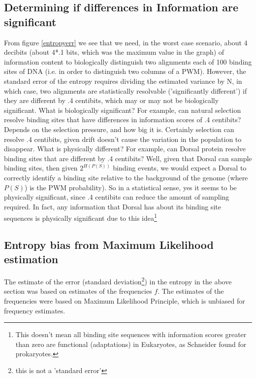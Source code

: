 \subsection*{Determining if differences in Information are significant}

From figure \ref{entropyerr} we see that we need, in the worst case scenario, about 4 decibits (about 4*.1 bits, which was the maximum value in the graph) of information content to biologically distinguish two alignments each of 100 binding sites of DNA (i.e. in order to distinguish two columns of a PWM).  However, the standard error of the entropy requires dividing the estimated variance by N, in which case, two alignments are statistically resolvable ('significantly different') if they are different by .4 centibits, which may or may not be biologically significant.  What is biologically significant?  For example, can natural selection resolve binding sites that have differences in information scores of .4 centibits?  Depends on the selection pressure, and how big it is.  Certainly selection can resolve .4 centibits, given drift doesn't cause the variation in the population to disappear.  What is physically different?  For example, can Dorsal protein resolve binding sites that are different by .4 centibits?  Well, given that Dorsal can sample binding sites, then given $2^{H(P(S))}$ binding events, we would expect a Dorsal to correctly identify a binding site relative to the background of the genome (where $P(S)$) is the PWM probability).  So in a statistical sense, yes it seems to be physically significant, since .4 centibits can reduce the amount of sampling required.  In fact, any information that Dorsal has about its binding site sequences is physically significant due to this idea\footnote{This doesn't mean all binding site sequences with information scores greater than zero are functional (adaptations) in Eukaryotes, as Schneider found for prokaryotes\cite{pmid3525846}.}  


\subsection*{Entropy bias from Maximum Likelihood estimation}
The estimate of the error (standard deviation\footnote{this is not a 'standard error'}) in the entropy in the above section was based on estimates of the frequencies $f$.  The estimates of the frequencies were based on Maximum Likelihood  Principle, which is unbiased for frequency estimates.  

